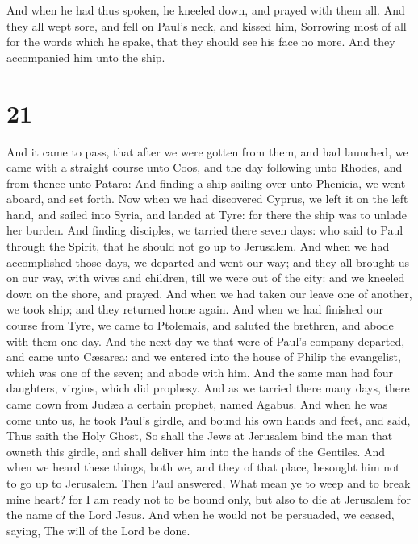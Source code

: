  And when he had thus spoken, he kneeled down, and prayed
with them all.  And they all wept sore, and fell on
Paul's neck, and kissed him,  Sorrowing most of all for
the words which he spake, that they should see his face no more. And
they accompanied him unto the ship.

\hypertarget{section-20}{%
\section{21}\label{section-20}}

 And it came to pass, that after we were gotten from them,
and had launched, we came with a straight course unto Coos, and the day
following unto Rhodes, and from thence unto Patara:  And
finding a ship sailing over unto Phenicia, we went aboard, and set
forth.  Now when we had discovered Cyprus, we left it on
the left hand, and sailed into Syria, and landed at Tyre: for there the
ship was to unlade her burden.  And finding disciples, we
tarried there seven days: who said to Paul through the Spirit, that he
should not go up to Jerusalem.  And when we had
accomplished those days, we departed and went our way; and they all
brought us on our way, with wives and children, till we were out of the
city: and we kneeled down on the shore, and prayed.  And
when we had taken our leave one of another, we took ship; and they
returned home again.  And when we had finished our course
from Tyre, we came to Ptolemais, and saluted the brethren, and abode
with them one day.  And the next day we that were of
Paul's company departed, and came unto Cæsarea: and we entered into the
house of Philip the evangelist, which was one of the seven; and abode
with him.  And the same man had four daughters, virgins,
which did prophesy.  And as we tarried there many days,
there came down from Judæa a certain prophet, named Agabus.
 And when he was come unto us, he took Paul's girdle, and
bound his own hands and feet, and said, Thus saith the Holy Ghost, So
shall the Jews at Jerusalem bind the man that owneth this girdle, and
shall deliver him into the hands of the Gentiles.  And
when we heard these things, both we, and they of that place, besought
him not to go up to Jerusalem.  Then Paul answered, What
mean ye to weep and to break mine heart? for I am ready not to be bound
only, but also to die at Jerusalem for the name of the Lord Jesus.
 And when he would not be persuaded, we ceased, saying,
The will of the Lord be done.


